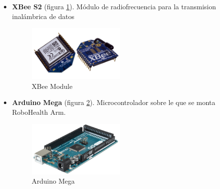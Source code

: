 \begin{itemize}
\item \textbf{XBee S2} (figura \ref{fig:Xbee}). Módulo de radiofrecuencia para la transmision inalámbrica de datos

\begin{figure}[H]
\centering
\includegraphics[width=0.45\textwidth]{figuras/XBee.png}
\caption{XBee Module}
\label{fig:Xbee}
\end{figure}

\item \textbf{Arduino Mega} (figura \ref{fig:AMega}). Microcontrolador sobre le que se monta RoboHealth Arm.

\begin{figure}[H]
\centering
\includegraphics[width=0.45\textwidth]{figuras/AMega.png}
\caption{Arduino Mega}
\label{fig:AMega}
\end{figure}

\end{itemize}

